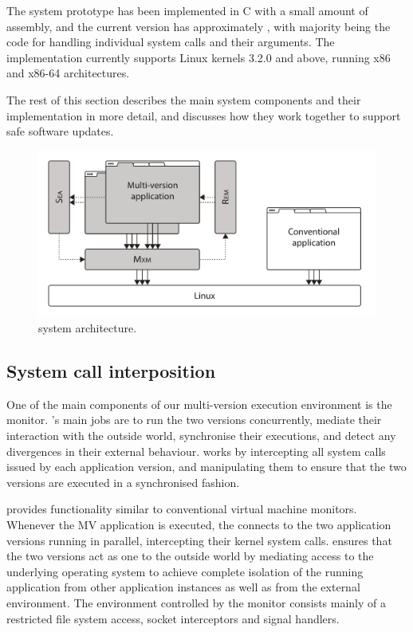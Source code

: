 The system prototype has been implemented in C with a small amount of assembly,
and the current version has approximately \mxSLOC, with majority being the code
for handling individual system calls and their arguments. The implementation
currently supports Linux kernels 3.2.0 and above, running x86 and x86-64
architectures.

The rest of this section describes the main \mx system components and
their implementation in more detail, and discusses how they work
together to support safe software updates.

\begin{figure}[t!]
\begin{center}
\includegraphics[width=0.6\columnwidth]{safe-updates/figures/architecture}
\caption{\mx system architecture.  
}
\label{fig:design}
\end{center}
\end{figure}


\subsection{System call interposition}
\label{sec:mxm}

One of the main components of our multi-version execution environment is the
\mxm monitor.  \mxm's main jobs are to run the two versions concurrently,
mediate their interaction with the outside world, synchronise their executions,
and detect any divergences in their external behaviour. \mxm works by
intercepting all system calls issued by each application version, and
manipulating them to ensure that the two versions are executed in a
synchronised fashion.

\mxm provides functionality similar to conventional virtual machine monitors.
Whenever the MV application is executed, the \mxm connects to the two
application versions running in parallel, intercepting their kernel system
calls.  \mxm ensures that the two versions act as one to the outside world by
mediating access to the underlying operating system to achieve complete
isolation of the running application from other application instances as well
as from the external environment.  The environment controlled by the monitor
consists mainly of a restricted file system access, socket interceptors and
signal handlers.


